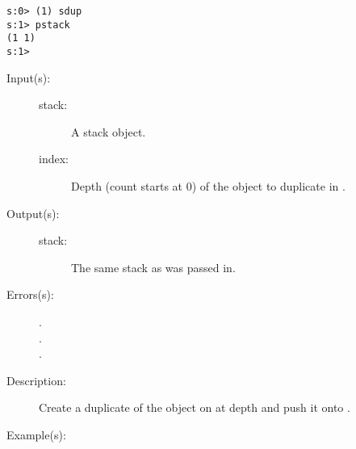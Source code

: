 \begin{description}
\begin{description}
\begin{verbatim}
s:0> (1) sdup
s:1> pstack
(1 1)
s:1>
		\end{verbatim}
	\end{description}
\label{systemdict:sindex}
\item[{\stilop{stack index}{sindex}{stack}}: ]
	\begin{description}\item[]
	\item[Input(s): ]
		\begin{description}\item[]
		\item[stack: ]
			A stack object.
		\item[index: ]
			Depth (count starts at 0) of the object to duplicate in
			.
		\end{description}
	\item[Output(s): ]
		\begin{description}\item[]
		\item[stack: ]
			The same stack as was passed in.
		\end{description}
	\item[Errors(s): ]
		\begin{description}\item[]
		\item[.]
		\item[.]
		\item[.]
		\end{description}
	\item[Description: ]
		Create a duplicate of the object on  at depth
		 and push it onto .
	\item[Example(s): ]\begin{verbatim}


\end{verbatim}
\end{description}
\end{description}
